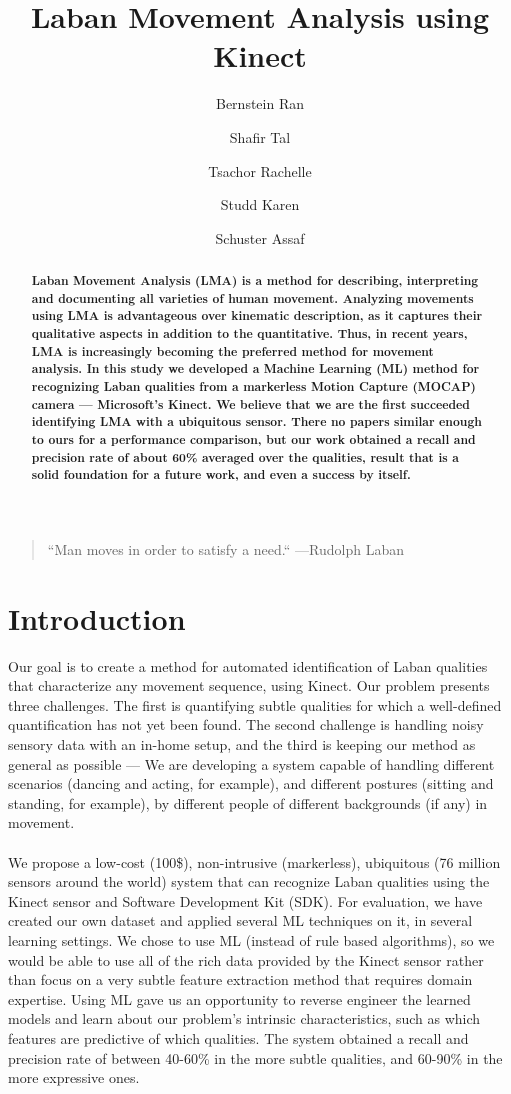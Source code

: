 \documentclass[11pt,twocolumn,varwidth=true,a4paper,fleqn]{article}
\author[1]{Bernstein Ran}
\author[2]{Shafir Tal}
\author[3]{Tsachor Rachelle}
\author[4]{Studd Karen}
\author[1]{Schuster Assaf}
\affil[1]{Department of Computer Science, Technion I.I.T, Haifa, Israel}
\affil[2]{The Graduate School of Creative Arts Therapies, University of Haifa}
\affil[3]{School of Theatre \& Music, The University of Illinois at Chicago}
\affil[4]{School of Dance, George Mason University}
\begin{document}
\nocite{*}

\title{Laban Movement Analysis using Kinect}
\date{}
\maketitle
\begin{quote}{``Man moves in order to satisfy a need.`` ---\textup{Rudolph Laban}}
\end{quote}
\begin{abstract}
\textbf{Laban Movement Analysis (LMA) is a method for describing, interpreting
and documenting all varieties of human movement. 
Analyzing movements using LMA is advantageous over kinematic description, 
as it captures their qualitative aspects in addition to the quantitative. 
Thus, in recent years, LMA is increasingly becoming the preferred method for movement analysis. 
In this study we developed a Machine Learning (ML) method for recognizing Laban qualities from 
a markerless Motion Capture (MOCAP) camera --- Microsoft's Kinect. 
We believe that we are the first succeeded identifying LMA with a ubiquitous
sensor.
There no papers similar enough to ours for a performance comparison,
but our work obtained a recall and precision rate of about 60\%  averaged over
the qualities, result that is a solid foundation for a future work, and even a
success by itself.}
\end{abstract}
\section{Introduction}
Our goal is to create a method for automated identification of Laban qualities that 
characterize any movement sequence, using Kinect. 
Our problem presents three challenges. The first is
quantifying subtle qualities for which a well-defined quantification has not yet been found. 
The second challenge is handling noisy sensory data with an in-home setup, and the
third is keeping our method as general as possible --- We are developing a system capable of 
handling different scenarios (dancing and acting, for example), and different postures 
(sitting and standing, for example), by different people of different backgrounds (if any) 
in movement. 
\\\\We propose a low-cost (100\$), non-intrusive
(markerless), ubiquitous (76 million sensors around the world) system that can recognize Laban qualities using the Kinect sensor and Software Development Kit (SDK).
For evaluation, we have created our own dataset and applied several ML
techniques on it, in several learning settings. We chose to use ML (instead of rule based algorithms), so 
we would be able to use all of the rich data provided by the Kinect sensor rather than focus on a very 
subtle feature extraction method that requires domain expertise. Using ML gave us
an opportunity to reverse engineer the learned models and learn about
our problem's intrinsic characteristics, such as which features are predictive
of which qualities. The system obtained a recall and precision rate of between
40-60\% in the more subtle qualities, and 60-90\% in the more expressive ones.
\end{document}
